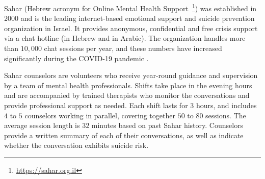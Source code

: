 \documentclass[letterpaper]{article} %
\newcommand{\kibitz}[2]{\ifnum\Comments=1{\textcolor{#1}{#2}}\fi}
\newcommand{\kg}[1]{\kibitz{red}{[KG:#1]}}
\newcommand{\di}[1]{\kibitz{blue}{[DI:#1]}}
\begin{document}

Sahar (Hebrew acronym for Online Mental Health Support~\footnote{\url{https://sahar.org.il}})   was established in 2000 and is the leading internet-based emotional support and suicide prevention organization in Israel. It provides anonymous, confidential and free crisis support via a chat hotline (in Hebrew and in Arabic). The organization handles more than $10,000$ chat sessions per year, and these numbers have increased significantly during the COVID-19 pandemic \cite{zalsman2021suicide}.

Sahar counselors are volunteers who  receive year-round guidance and supervision by a team of mental health professionals.
Shifts take place in the evening hours and are   accompanied by trained therapists who monitor the conversations and provide professional support as needed. Each shift lasts for 3 hours, and includes $4$ to $5$ counselors working in parallel, covering together $50$ to $80$  sessions. The average session length is $32$ minutes based on past Sahar history.
Counselors provide a written summary of each of their conversations, as well as  indicate whether the conversation exhibits suicide risk.

\end{document}
